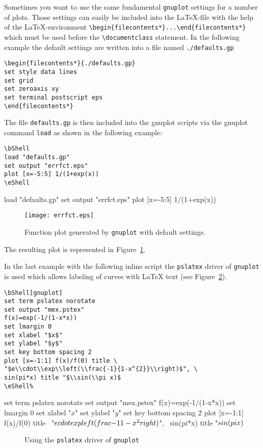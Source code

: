 Sometimes you want to use the same fundamental \texttt{gnuplot}
settings for a number of plots. Those settings can easily be
included into the \LaTeX-file with the help of the \LaTeX-environment
\verb=\begin{filecontents*}...\end{filecontents*}=
which must be used before the
\verb=\documentclass= statement. In the following example the default
settings are written into a file named \texttt{./defaults.gp}
\begin{verbatim}
\begin{filecontents*}{./defaults.gp}
set style data lines
set grid
set zeroaxis xy
set terminal postscript eps
\end{filecontents*}
\end{verbatim}
The file \texttt{defaults.gp} is then included into the gnuplot
scripts via the gnuplot command \texttt{load} as shown in the
following example:
\begin{verbatim}
\bShell
load "defaults.gp"
set output "errfct.eps"
plot [x=-5:5] 1/(1+exp(x))
\eShell
\end{verbatim}
\bShell
load "defaults.gp"
set output "errfct.eps"
plot [x=-5:5] 1/(1+exp(x))
\eShell
\begin{figure}
  \centering
  \texttt{[image: errfct.eps]}
  \caption{Function plot generated by \texttt{gnuplot} with default
    settings.}
  \label{fig:errfct}
\end{figure}
The resulting plot is represented in Figure~\ref{fig:errfct}.
\clearpage

In the last example with the following inline script the
\texttt{pslatex} driver of \texttt{gnuplot} is used which allows
labeling of curves with \LaTeX{} text (see Figure~\ref{fig:mex}).

\begin{verbatim}
\bShell[gnuplot]
set term pslatex norotate
set output "mex.pstex"
f(x)=exp(-1/(1-x*x))
set lmargin 0
set xlabel "$x$"
set ylabel "$y$"
set key bottom spacing 2
plot [x=-1:1] f(x)/f(0) title \
"$e\\cdot\\exp\\left(\\frac{-1}{1-x^{2}}\\right)$", \
sin(pi*x) title "$\\sin(\\pi x)$
\eShell%
\end{verbatim}
\bShell[gnuplot]
set term pslatex norotate
set output "mex.pstex"
f(x)=exp(-1/(1-x*x))
set lmargin 0
set xlabel "$x$"
set ylabel "$y$"
set key bottom spacing 2
plot [x=-1:1] f(x)/f(0) title \
"$e\\cdot\\exp\\left(\\frac{-1}{1-x^{2}}\\right)$", \
sin(pi*x) title "$\\sin(\\pi x)$
\eShell%
\begin{figure}
  \center
  \fbox{}
  \caption{Using the \texttt{pslatex} driver of \texttt{gnuplot}}
  \label{fig:mex}
\end{figure}


